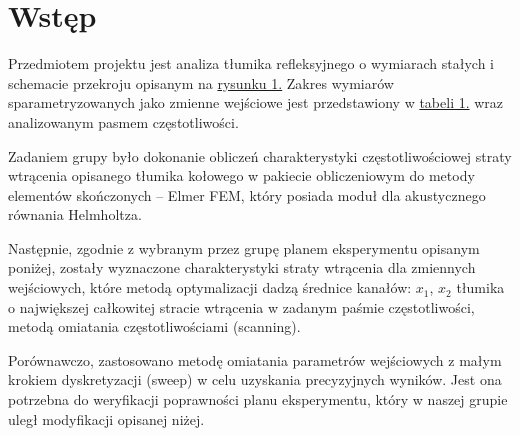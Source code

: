 \documentclass{sprawozdanie-agh}
\begin{document}
\section{Wstęp}
\par Przedmiotem projektu jest analiza tłumika refleksyjnego o wymiarach stałych i schemacie przekroju opisanym na \hyperref[rysunek]{rysunku 1.} Zakres wymiarów sparametryzowanych jako zmienne wejściowe jest przedstawiony w \hyperref[tabela]{tabeli 1.} wraz analizowanym pasmem częstotliwości.
\par Zadaniem grupy było dokonanie obliczeń charakterystyki częstotliwościowej straty wtrącenia opisanego tłumika kołowego w pakiecie obliczeniowym do metody elementów skończonych -- Elmer FEM, który posiada moduł dla akustycznego równania Helmholtza.
\par Następnie, zgodnie z wybranym przez grupę planem eksperymentu opisanym poniżej, zostały wyznaczone charakterystyki straty wtrącenia dla zmiennych wejściowych, które metodą optymalizacji dadzą średnice kanałów: $x_1$, $x_2$ tłumika o największej całkowitej stracie wtrącenia w zadanym paśmie częstotliwości, metodą omiatania częstotliwościami (scanning).
\par Porównawczo, zastosowano metodę omiatania parametrów wejściowych z małym krokiem dyskretyzacji (sweep) w celu uzyskania precyzyjnych wyników. Jest ona potrzebna do weryfikacji poprawności planu eksperymentu, który w naszej grupie uległ modyfikacji opisanej niżej.
\end{document}
